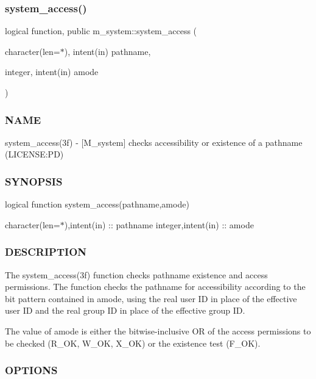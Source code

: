 \subsubsection{\texorpdfstring{system\+\_\+access()}{system\_access()}}
{\footnotesize\ttfamily logical function, public m\+\_\+system\+::system\+\_\+access (\begin{DoxyParamCaption}\item[{character(len=$\ast$), intent(in)}]{pathname,  }\item[{integer, intent(in)}]{amode }\end{DoxyParamCaption})}



\subsubsection*{N\+A\+ME}

system\+\_\+access(3f) -\/ \mbox{[}M\+\_\+system\mbox{]} checks accessibility or existence of a pathname (L\+I\+C\+E\+N\+SE\+:PD) 

\subsubsection*{S\+Y\+N\+O\+P\+S\+IS}

logical function system\+\_\+access(pathname,amode)

character(len=$\ast$),intent(in) \+:\+: pathname integer,intent(in) \+:\+: amode

\subsubsection*{D\+E\+S\+C\+R\+I\+P\+T\+I\+ON}

\begin{DoxyVerb}The system_access(3f) function checks pathname existence and access
permissions. The function checks the pathname for accessibility
according to the bit pattern contained in amode, using the real user
ID in place of the effective user ID and the real group ID in place
of the effective group ID.

The value of amode is either the bitwise-inclusive OR of the access
permissions to be checked (R_OK, W_OK, X_OK) or the existence test (F_OK).
\end{DoxyVerb}


\subsubsection*{O\+P\+T\+I\+O\+NS}

